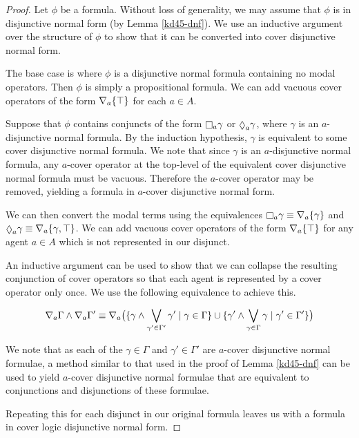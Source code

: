 \begin{proof}
Let $\phi$ be a \logicKD{} formula.  Without loss of generality, we may assume
that $\phi$ is in disjunctive normal form (by Lemma \ref{kd45-dnf}). We use an
inductive argument over the structure of $\phi$ to show that it can be converted
into cover disjunctive normal form.

The base case is where $\phi$ is a disjunctive normal formula containing no
modal operators. Then $\phi$ is simply a propositional formula. We can add
vacuous cover operators of the form $\nabla_a \{\top\}$ for each $a \in A$.

Suppose that $\phi$ contains conjuncts of the form $\knows_a \gamma$ or
$\suspects_a \gamma$, where $\gamma$ is an $a$-disjunctive normal formula. By
the induction hypothesis, $\gamma$ is equivalent to some cover disjunctive
normal formula. We note that since $\gamma$ is an $a$-disjunctive normal
formula, any $a$-cover operator at the top-level of the equivalent cover
disjunctive normal formula must be vacuous. Therefore the $a$-cover operator may
be removed, yielding a formula in $a$-cover disjunctive normal form.

We can then convert the modal terms using the equivalences $\knows_a \gamma
\equiv \covers_a \{\gamma\}$ and $\suspects_a \gamma \equiv \covers_a \{\gamma,
\top\}$. We can add vacuous cover operators of the form $\nabla_a \{\top\}$ for
any agent $a \in A$ which is not represented in our disjunct.

An inductive argument can be used to show that we can collapse the resulting
conjunction of cover operators so that each agent is represented by a cover
operator only once. We use the following equivalence to achieve this.

$$
\nabla_a \Gamma \land \nabla_a \Gamma' \equiv 
\nabla_a \big( 
\{ \gamma \land \bigvee_{\gamma' \in \Gamma'} \gamma' \mid \gamma \in \Gamma \}
\cup
\{ \gamma' \land \bigvee_{\gamma \in \Gamma} \gamma \mid \gamma' \in \Gamma' \}
\big)
$$

We note that as each of the $\gamma \in \Gamma$ and $\gamma' \in \Gamma'$ are
$a$-cover disjunctive normal formulae, a method similar to that used in the
proof of Lemma \ref{kd45-dnf} can be used to yield $a$-cover disjunctive normal
formulae that are equivalent to conjunctions and disjunctions of these formulae.

Repeating this for each disjunct in our original formula leaves us with a
formula in cover logic disjunctive normal form.
\end{proof}

